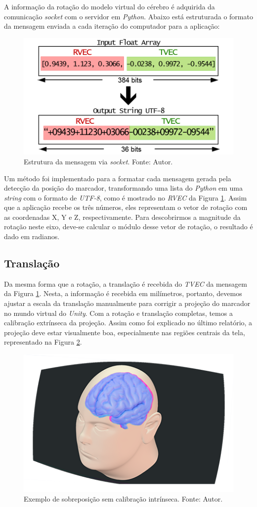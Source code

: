 A informação da rotação do modelo virtual do cérebro é adquirida da comunicação \textit{socket} com o servidor em \textit{Python}. Abaixo está estruturada o formato da mensagem enviada a cada iteração do computador para a aplicação:

\begin{figure}[ht]
    \centering
    \includegraphics[width=.55\textwidth]{figuras/format rodrigues.png}
    \caption{Estrutura da mensagem via \textit{socket}. Fonte: Autor.}
    \label{fig:frodrigues}
\end{figure}

Um método foi implementado para a formatar cada mensagem gerada pela detecção da posição do marcador, transformando uma lista do \textit{Python} em uma \textit{string} com o formato de \textit{UTF-8}, como é mostrado no \textit{RVEC} da Figura \ref{fig:frodrigues}. Assim que a aplicação recebe os três números, eles representam o vetor de rotação com as coordenadas X, Y e Z, respectivamente. Para descobrirmos a magnitude da rotação neste eixo, deve-se calcular o módulo desse vetor de rotação, o resultado é dado em radianos.

\subsection{Translação}

Da mesma forma que a rotação, a translação é recebida do \textit{TVEC} da mensagem da Figura \ref{fig:frodrigues}. Nesta, a informação é recebida em milímetros, portanto, devemos ajustar a escala da translação manualmente para corrigir a projeção do marcador no mundo virtual do \textit{Unity}. Com a rotação e translação completas, temos a calibração extrínseca da projeção. Assim como foi explicado no último relatório, a projeção deve estar visualmente boa, especialmente nas regiões centrais da tela, representado na Figura \ref{fig:Extrinsecos}.

\begin{figure}[ht]
    \centering
    \includegraphics[width=.45\linewidth]{figuras/CalibExtr.png}
    \caption{Exemplo de sobreposição sem calibração intrínseca. Fonte: Autor.}
    \label{fig:Extrinsecos}
\end{figure}


